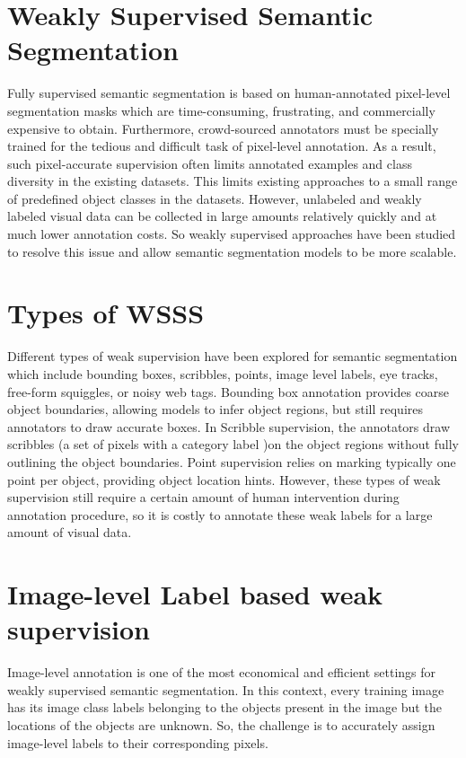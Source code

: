 
\section{Weakly Supervised Semantic Segmentation}
\label{sec:weakly-supervised}
Fully supervised semantic segmentation is based on human-annotated pixel-level segmentation masks which are time-consuming, frustrating, and commercially expensive to obtain. Furthermore, crowd-sourced annotators must be specially trained for the tedious and difficult task of pixel-level annotation. As a result, such pixel-accurate supervision often limits annotated examples and class diversity in the existing datasets. This limits existing approaches to a small range of predefined object classes in the datasets. However, unlabeled and weakly labeled visual data can be collected in large amounts relatively quickly and at much lower annotation costs. So weakly supervised approaches have been studied to resolve this issue and allow semantic segmentation models to be more scalable.

\section{Types of WSSS}
\label{sec:types-weakly-supervised}
Different types of weak supervision have been explored for semantic segmentation which include bounding boxes, scribbles, points, image level labels, eye tracks, free-form squiggles, or noisy web tags. Bounding box annotation provides coarse object boundaries, allowing models to infer object regions, but still requires annotators to draw accurate boxes. In Scribble supervision, the annotators draw scribbles (a set of pixels with a category label )on the object regions without fully outlining the object boundaries. Point supervision relies on marking typically one point per object, providing object location hints. However, these types of weak supervision still require a certain amount of human intervention during annotation procedure, so it is costly to annotate these weak labels for a large amount of visual data.


\section{Image-level Label based weak supervision}
\label{sec:image-level-label}
Image-level annotation is one of the most economical and efficient settings for weakly supervised semantic segmentation. In this context, every training image has its image class labels belonging to the objects present in the image but the locations of the objects are unknown. So, the challenge is to accurately assign image-level labels to their corresponding pixels.

